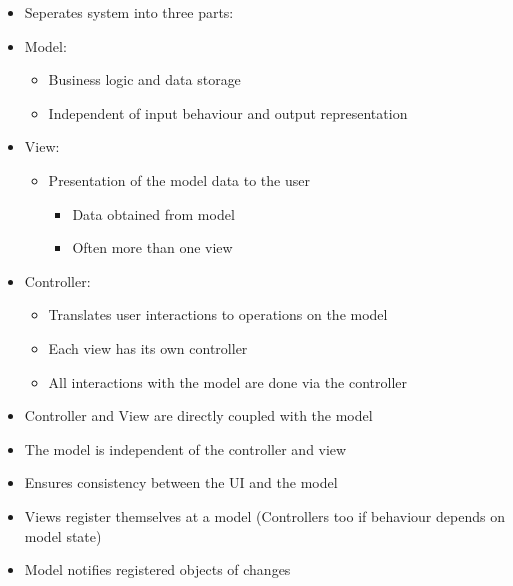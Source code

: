 \documentclass[
../../Software_Engineering_Summary.tex,
]
{subfiles}
\begin{document}
\begin{defbox*}
    \begin{itemize}
        \item Seperates system into three parts:
        \item Model:
        \begin{itemize}
            \item Business logic and data storage
            \item Independent of input behaviour and output representation
        \end{itemize}
        \item View:
        \begin{itemize}
            \item Presentation of the model data to the user
            \begin{itemize}
                \item Data obtained from model
                \item Often more than one view
            \end{itemize}
        \end{itemize}
        \item Controller:
        \begin{itemize}
            \item Translates user interactions to operations on the model
            \item Each view has its own controller
            \item All interactions with the model are done via the controller
        \end{itemize}
        \item Controller and View are directly coupled with the model
        \item The model is independent of the controller and view
    \end{itemize}
\end{defbox*}

\begin{defbox}
    \begin{itemize}
        \item Ensures consistency between the UI and the model
        \item Views register themselves at a model (Controllers too if behaviour depends on model state)
        \item Model notifies registered objects of changes
    \end{itemize}
\end{defbox}
\end{document}
